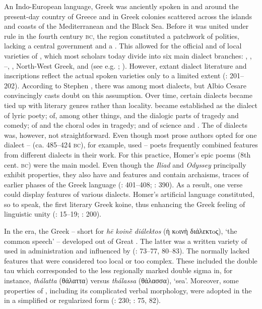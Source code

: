 An Indo-European language, Greek was anciently spoken in and around the present-day country of Greece and in Greek colonies scattered across the islands and coasts of the Mediterranean and the Black Sea. Before it was united under  rule in the fourth century \textsc{bc}, the region constituted a patchwork of polities, lacking a central government and a . This allowed for the official and  of local varieties of , which most scholars today divide into six main dialect branches: , , –, , North-West Greek, and  (see e.g. \citealt{Colvin2010}; \citealt{Finkelberg2014}). However, extant dialect literature and inscriptions reflect the actual spoken varieties only to a limited extent (\citealt{Colvin2010}: 201–202). According to Stephen \citet[300, 303]{Colvin1999}, there was  among most dialects, but Albio Cesare \citet[4--5]{Cassio2016} convincingly casts doubt on this assumption. Over time, certain dialects became tied up with literary genres rather than locality.  became established as the dialect of lyric poety;  of, among other things,  and the dialogic parts of tragedy and comedy;  of  and the choral odes in tragedy; and  of science and . The  of dialects was, however, not straightforward. Even though most prose authors opted for one dialect –  (ca. 485–424 \textsc{bc}), for example, used  – poets frequently combined features from different dialects in their work. For this practice, Homer’s epic poems (8th cent. \textsc{bc}) were the main model. Even though the \textit{Iliad} and \textit{Odyssey} principally exhibit  properties, they also have  and  features and contain archaisms, traces of earlier phases of the Greek language (\citealt{Hackstein2010}: 401–408; \citealt{Tribulato2010}: 390). As a result, one verse could display features of various dialects. Homer’s artificial language constituted, so to speak, the first literary Greek koine, thus enhancing the Greek feeling of linguistic unity (\citealt{Morpurgo1987}: 15–19; \citealt{Colvin2010}: 200).

In the  era, the Greek  – short for \textit{hē koinḕ diálektos} (ἡ κoινὴ διάλεκτoς), ‘the common speech’ – developed out of Great . The latter was a written variety of  used in administration and influenced by  (\citealt{Horrocks2010}: 73–77, 80–83). The  normally lacked  features that were considered too local or too complex. These included the  double tau which corresponded to the less regionally marked double sigma in, for instance, \textit{thálatta} (θάλαττα) versus \textit{thálassa} (θάλασσα), ‘sea’. Moreover, some properties of , including its complicated verbal morphology, were adopted in the  in a simplified or regularized form (\citealt{Brixhe2010}: 230; \citealt{Horrocks2010}: 75, 82).

